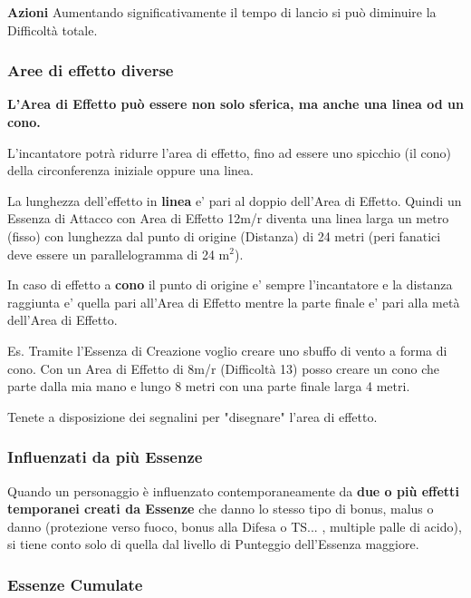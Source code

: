 \documentclass[a4paper,twoside,openany]{book}
\begin{document}
\begin{multicols}{2}
\textbf{Azioni}  
Aumentando significativamente il tempo di lancio  si può diminuire la Difficoltà totale.

\subsubsection{Aree di effetto diverse}

\label{aree-di-effetto-diverse}

\textbf{L'Area di Effetto può essere non solo sferica, ma anche una linea od un cono.}

L'incantatore potrà ridurre l'area di effetto, fino ad essere uno spicchio (il cono) della circonferenza iniziale oppure una linea.

La lunghezza dell'effetto in \textbf{linea} e' pari al doppio dell'Area di Effetto. Quindi un Essenza di Attacco con Area di Effetto 12m/r diventa una linea larga un metro (fisso) con lunghezza dal punto di origine (Distanza) di 24 metri (peri fanatici deve essere un parallelogramma di 24 m$^2$).

In caso di effetto a \textbf{cono} il punto di origine e' sempre l'incantatore e la distanza raggiunta e' quella pari all'Area di Effetto mentre la parte finale e' pari alla metà dell'Area di Effetto.

Es. Tramite l'Essenza di Creazione voglio creare uno sbuffo di vento a forma di cono.
Con un Area di Effetto di 8m/r (Difficoltà 13) posso creare un cono che parte dalla mia mano e lungo 8 metri con una parte finale larga 4 metri.

Tenete a disposizione dei segnalini per "disegnare" l'area di effetto.

\subsubsection{Influenzati da più Essenze}

\label{influenzati-da-piu-essenze}

Quando un personaggio è influenzato contemporaneamente da \textbf{due o più effetti temporanei creati da Essenze} che danno lo stesso tipo di bonus, malus o danno (protezione verso fuoco, bonus alla Difesa o TS... , multiple palle di acido), si tiene conto solo di quella dal livello di Punteggio dell'Essenza  maggiore.

\subsubsection{Essenze Cumulate}


\end{multicols}
\end{document}
